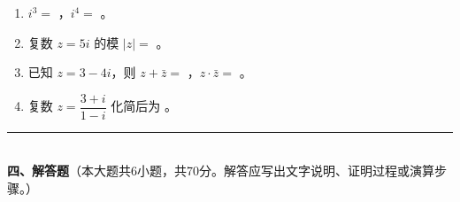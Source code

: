 \documentclass[12pt, a4paper]{ctexart}
\begin{document}
\vspace{6pt}

\begin{enumerate}[resume]
\item $i^3=$ \underline{\hspace{2cm}}，$i^4=$ \underline{\hspace{2cm}}。

\item 复数 $z=5i$ 的模 $|z|=$ \underline{\hspace{2cm}}。

\item 已知 $z=3-4i$，则 $z+\bar{z}=$ \underline{\hspace{2cm}}，$z\cdot\bar{z}=$ \underline{\hspace{2cm}}。

\item 复数 $z=\dfrac{3+i}{1-i}$ 化简后为 \underline{\hspace{2cm}}。
\end{enumerate}

\vspace{6pt}

\noindent\rule{\textwidth}{0.4pt}\\[2pt]
{\large\bfseries 四、解答题}（本大题共6小题，共70分。解答应写出文字说明、证明过程或演算步骤。）

\vspace{6pt}
\end{document}
